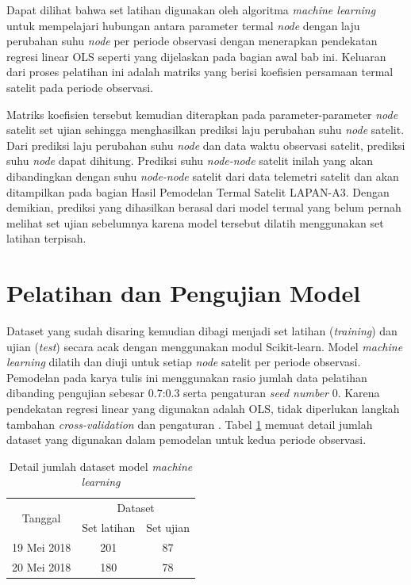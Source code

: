 Dapat dilihat bahwa set latihan digunakan oleh algoritma \textit{machine
learning} untuk mempelajari hubungan antara parameter termal \textit{node}
dengan laju perubahan suhu \textit{node} per periode observasi dengan
menerapkan pendekatan regresi linear OLS seperti yang dijelaskan pada bagian
awal bab ini. Keluaran dari proses pelatihan ini adalah matriks yang berisi
koefisien persamaan termal satelit pada periode observasi.

Matriks koefisien tersebut kemudian diterapkan pada parameter-parameter
\textit{node} satelit set ujian sehingga menghasilkan prediksi laju perubahan
suhu \textit{node} satelit. Dari prediksi laju perubahan suhu \textit{node} dan
data waktu observasi satelit, prediksi suhu \textit{node} dapat dihitung.
Prediksi suhu \textit{node-node} satelit inilah yang akan dibandingkan dengan
suhu \textit{node-node} satelit dari data telemetri satelit dan akan
ditampilkan pada bagian Hasil Pemodelan Termal Satelit LAPAN-A3. Dengan
demikian, prediksi yang dihasilkan berasal dari model termal yang belum pernah
melihat set ujian sebelumnya karena model tersebut dilatih menggunakan set
latihan terpisah.

\section{Pelatihan dan Pengujian Model}

Dataset yang sudah disaring kemudian dibagi menjadi set latihan
(\textit{training}) dan ujian (\textit{test}) secara acak dengan menggunakan
modul Scikit-learn. Model \textit{machine learning} dilatih dan diuji untuk
setiap \textit{node} satelit per periode observasi. Pemodelan pada karya tulis
ini menggunakan rasio jumlah data pelatihan dibanding pengujian sebesar 0.7:0.3
serta pengaturan \textit{seed number} 0. Karena pendekatan regresi linear yang
digunakan adalah OLS, tidak diperlukan langkah tambahan
\textit{cross-validation} dan pengaturan . Tabel
\ref{table:dataset} memuat detail jumlah dataset yang digunakan dalam pemodelan
untuk kedua periode observasi.

\begin{table}[!ht]
\begin{center}
\caption{Detail jumlah dataset model \textit{machine learning}}
\label{table:dataset}
\begin{tabular}{|c|cc|}
\hline
\multirow{2}{*}{Tanggal} & \multicolumn{2}{c|}{Dataset}                 \\ \cline{2-3} 
                         & \multicolumn{1}{c|}{Set latihan} & Set ujian \\ \hline
19 Mei 2018              & \multicolumn{1}{c|}{201}         & 87        \\ \hline
20 Mei 2018              & \multicolumn{1}{c|}{180}         & 78        \\ \hline
\end{tabular}
\end{center}
\vspace{-5mm}
\end{table}

